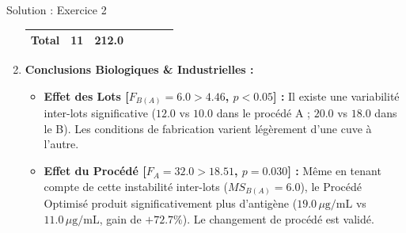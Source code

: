 \documentclass[11pt,a4paper]{article}
\begin{document}
\begin{solutionbox}{Solution : Exercice 2}
\begin{enumerate}[label=\textbf{\alph*.}]
\begin{center}
{\begin{tabular}{lcccccc}
  \midrule
  \textbf{Total} & 11 & 212.0 & & & & \\
  \bottomrule
  \end{tabular}%
  }
  \end{center}
  \item \textbf{Conclusions Biologiques \& Industrielles :}
  \begin{itemize}
    \item \textbf{Effet des Lots [$F_{B(A)} = 6.0 > 4.46$, $p < 0.05$] :} Il existe une variabilité inter-lots significative ($12.0$ vs $10.0$ dans le procédé A ; $20.0$ vs $18.0$ dans le B). Les conditions de fabrication varient légèrement d'une cuve à l'autre.
    \item \textbf{Effet du Procédé [$F_A = 32.0 > 18.51$, $p = 0.030$] :} Même en tenant compte de cette instabilité inter-lots ($MS_{B(A)} = 6.0$), le Procédé Optimisé produit significativement plus d'antigène ($19.0\,\mu\text{g/mL}$ vs $11.0\,\mu\text{g/mL}$, gain de $+72.7\%$). Le changement de procédé est validé.
  \end{itemize}
\end{enumerate}
\end{solutionbox}
\end{document}
